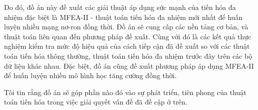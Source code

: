 
Do đó, đồ án này đề xuất các giải thuật áp dụng sức mạnh của tiến hóa đa nhiệm đặc biệt là MFEA-II - thuật toán tiến hóa đa nhiệm mới nhất để huấn luyện nhiều mạng nơ-ron đồng thời. Đồ án sẽ cung cấp các nền tảng cơ bản, và thuật toán liên quan đến phương pháp đề xuất. Cùng với đó là các kết quả thực nghiệm kiểm tra mức độ hiệu quả của cách tiếp cận đã đề xuất so với các thuật toán tiến hóa thông thường, thuật toán tiến hóa đa nhiệm trước đây trên các bộ dữ liệu khác nhau. Đặc biệt, đồ án cũng đề xuất phương pháp áp dụng MFEA-II để huấn luyện nhiều mô hình học tăng cường đồng thời. 

Tôi tin rằng đồ án sẽ góp phần nào đó vào sự phát triển, tiên phong của thuật toán tiến hóa trong việc giải quyết vấn đề đã đề cập ở trên.

